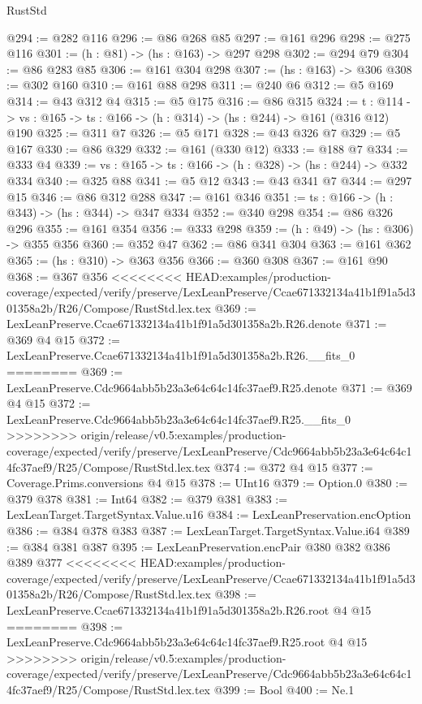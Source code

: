 \begin{lexlean}{RustStd}
\begin{coremodule}
{\begin{coremodule}
@294 := @282 @116
@296 := @86 @268 @85
@297 := @161 @296
@298 := @275 @116
@301 := (h : @81) -> (hs : @163) -> @297 @298
@302 := @294 @79
@304 := @86 @283 @85
@306 := @161 @304 @298
@307 := (hs : @163) -> @306
@308 := @302 @160
@310 := @161 @88 @298
@311 := @240 @6
@312 := @5 @169
@314 := @43 @312 @4
@315 := @5 @175
@316 := @86 @315
@324 := {t : @114} ->
  {vs : @165} -> {ts : @166} -> (h : @314) -> (hs : @244) -> @161 (@316 @12) @190
@325 := @311 @7
@326 := @5 @171
@328 := @43 @326 @7
@329 := @5 @167
@330 := @86 @329
@332 := @161 (@330 @12)
@333 := @188 @7
@334 := @333 @4
@339 := {vs : @165} -> {ts : @166} -> (h : @328) -> (hs : @244) -> @332 @334
@340 := @325 @88
@341 := @5 @12
@343 := @43 @341 @7
@344 := @297 @15
@346 := @86 @312 @288
@347 := @161 @346
@351 := {ts : @166} -> (h : @343) -> (hs : @344) -> @347 @334
@352 := @340 @298
@354 := @86 @326 @296
@355 := @161 @354
@356 := @333 @298
@359 := (h : @49) -> (hs : @306) -> @355 @356
@360 := @352 @47
@362 := @86 @341 @304
@363 := @161 @362
@365 := (hs : @310) -> @363 @356
@366 := @360 @308
@367 := @161 @90
@368 := @367 @356
<<<<<<<< HEAD:examples/production-coverage/expected/verify/preserve/LexLeanPreserve/Ccae671332134a41b1f91a5d301358a2b/R26/Compose/RustStd.lex.tex
@369 := LexLeanPreserve.Ccae671332134a41b1f91a5d301358a2b.R26.denote
@371 := @369 @4 @15
@372 := LexLeanPreserve.Ccae671332134a41b1f91a5d301358a2b.R26.__fits_0
========
@369 := LexLeanPreserve.Cdc9664abb5b23a3e64c64c14fc37aef9.R25.denote
@371 := @369 @4 @15
@372 := LexLeanPreserve.Cdc9664abb5b23a3e64c64c14fc37aef9.R25.__fits_0
>>>>>>>> origin/release/v0.5:examples/production-coverage/expected/verify/preserve/LexLeanPreserve/Cdc9664abb5b23a3e64c64c14fc37aef9/R25/Compose/RustStd.lex.tex
@374 := @372 @4 @15
@377 := Coverage.Prims.conversions @4 @15
@378 := UInt16
@379 := Option.{0}
@380 := @379 @378
@381 := Int64
@382 := @379 @381
@383 := LexLeanTarget.TargetSyntax.Value.u16
@384 := LexLeanPreservation.encOption
@386 := @384 @378 @383
@387 := LexLeanTarget.TargetSyntax.Value.i64
@389 := @384 @381 @387
@395 := LexLeanPreservation.encPair @380 @382 @386 @389 @377
<<<<<<<< HEAD:examples/production-coverage/expected/verify/preserve/LexLeanPreserve/Ccae671332134a41b1f91a5d301358a2b/R26/Compose/RustStd.lex.tex
@398 := LexLeanPreserve.Ccae671332134a41b1f91a5d301358a2b.R26.root @4 @15
========
@398 := LexLeanPreserve.Cdc9664abb5b23a3e64c64c14fc37aef9.R25.root @4 @15
>>>>>>>> origin/release/v0.5:examples/production-coverage/expected/verify/preserve/LexLeanPreserve/Cdc9664abb5b23a3e64c64c14fc37aef9/R25/Compose/RustStd.lex.tex
@399 := Bool
@400 := Ne.{1}

\end{coremodule}}
\end{coremodule}
\end{lexlean}
